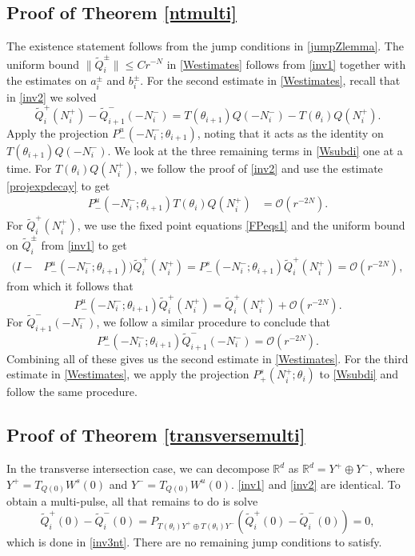 \documentclass[12pt]{elsarticle}
\def\R{{\mathbb R}}
\begin{document}
\subsection{Proof of Theorem \ref{ntmulti}}

The existence statement follows from the jump conditions in \cref{jumpZlemma}. The uniform bound $\|\tilde{Q}_i^\pm\| \leq C r^{-N}$ in \cref{Westimates} follows from \cref{inv1} together with the estimates on $a_i^\pm$ and $b_i^\pm$. For the second estimate in \cref{Westimates}, recall that in \cref{inv2} we solved
\begin{equation}\label{Wsubdi}
\tilde{Q}_i^+(N_i^+) - \tilde{Q}_{i+1}^-(-N_i^-) = T(\theta_{i+1}) Q(-N_i^-) - T(\theta_i) Q(N_i^+).
\end{equation}
Apply the projection $P^u_-(-N_i^-; \theta_{i+1})$, noting that it acts as the identity on $T(\theta_{i+1}) Q(-N_i^-)$. We look at the three remaining terms in \cref{Wsubdi} one at a time. For $T(\theta_i) Q(N_i^+)$, we follow the proof of \cref{inv2} and use the estimate \cref{projexpdecay} to get
\begin{align*}
P^u_-(-N_i^-; \theta_{i+1})T(\theta_i) Q(N_i^+)
&= \mathcal{O}(r^{-2N}).
\end{align*}
For $\tilde{Q}_i^+(N_i^+)$, we use the fixed point equations \cref{FPeqs1} and the uniform bound on $\tilde{Q}_i^\pm$ from \cref{inv1} to get
\begin{align*}
(I - &P^u_-(-N_i^-; \theta_{i+1})) \tilde{Q}_i^+(N_i^+) = P^s_-(-N_i^-; \theta_{i+1}) \tilde{Q}_i^+(N_i^+) = \mathcal{O}(r^{-2N}),
\end{align*}
from which it follows that
\[
P^u_-(-N_i^-; \theta_{i+1}) \tilde{Q}_i^+(N_i^+) = \tilde{Q}_i^+(N_i^+) + \mathcal{O}(r^{-2N}).
\]
For $\tilde{Q}_{i+1}^-(-N_i^-)$, we follow a similar procedure to conclude that
\[
P^u_-(-N_i^-; \theta_{i+1}) \tilde{Q}_{i+1}^-(-N_i^-) = \mathcal{O}(r^{-2N}).
\]
Combining all of these gives us the second estimate in \cref{Westimates}. For the third estimate in \cref{Westimates}, we apply the projection $P^s_+(N_i^+; \theta_i)$ to \cref{Wsubdi} and follow the same procedure.

\subsection{Proof of Theorem \ref{transversemulti}}

In the transverse intersection case, we can decompose $\R^d$ as $\R^d = Y^+ \oplus Y^-$, where $Y^+ = T_{Q(0)} W^s(0)$ and $Y^- = T_{Q(0)} W^u(0)$. \cref{inv1} and \cref{inv2} are identical. To obtain a multi-pulse, all that remains to do is solve 
\[
\tilde{Q}_i^+(0) - \tilde{Q}_i^-(0) = P_{T(\theta_i)Y^+ \oplus T(\theta_i)Y^-}( \tilde{Q}_i^+(0) - \tilde{Q}_i^-(0) ) = 0,
\]
which is done in \cref{inv3nt}. There are no remaining jump conditions to satisfy.
\end{document}

